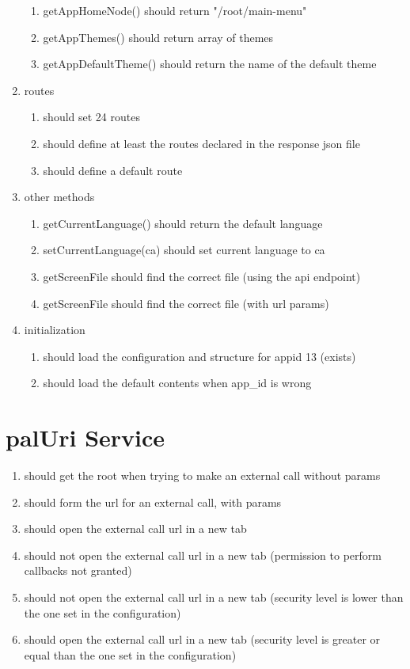\begin{singlespace}
\begin{enumerate}
\begin{enumerate}
\item         getAppHomeNode() should return "/root/main-menu"
\item         getAppThemes() should return array of themes
\item         getAppDefaultTheme() should return the name of the default theme
\end{enumerate}
\item     routes
\begin{enumerate}
\item         should set 24 routes
\item         should define at least the routes declared in the response json file
\item         should define a default route
\end{enumerate}
\item     other methods
\begin{enumerate}
\item         getCurrentLanguage() should return the default language
\item         setCurrentLanguage(ca) should set current language to ca
\item         getScreenFile should find the correct file (using the api endpoint)
\item         getScreenFile should find the correct file (with url params)
\end{enumerate}
\item     initialization
\begin{enumerate}
\item         should load the configuration and structure for appid 13 (exists)
\item         should load the default contents when app\_id is wrong
\end{enumerate}
\end{enumerate}

\section{palUri Service}
\begin{enumerate}
\item     should get the root when trying to make an external call without params
\item     should form the url for an external call, with params
\item     should open the external call url in a new tab
\item     should not open the external call url in a new tab (permission to perform callbacks not granted)
\item     should not open the external call url in a new tab (security level is lower than the one set in the configuration)
\item     should open the external call url in a new tab (security level is greater or equal than the one set in the configuration)
\end{enumerate}

\end{singlespace}
